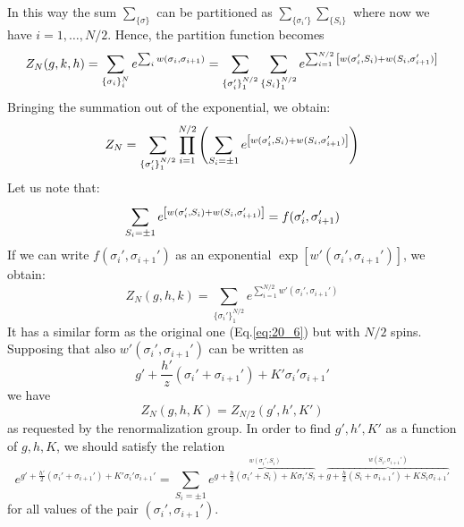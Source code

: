 \documentclass[../../Main/Main.tex]{subfiles}
\begin{document}
In this way the sum \( \sum_{\{ \sigma  \}  }^{}   \) can be partitioned as \( \sum_{\{ \sigma _i' \}  }^{} \sum_{\{ S_i \}  }^{}     \) where now we have \( i=1,\dots,N/2 \). Hence, the partition function becomes
\begin{equation}
  Z_N(g,k,h) = \sum_{\{ \sigma _i \}_i^N  }^{}  e^{\sum_{i}^{}  w (\sigma _i, \sigma _{i+1})}
  = \sum_{\{ \sigma _i' \}_1^{N/2}  }^{} \sum_{\{ S_i \}_1^{N/2}  }^{}
  e^{\sum_{i=1}^{N/2} \qty[w(\sigma _i',S_i) + w(S_i, \sigma _{i+1}')]  }
  \label{eq:20_6}
\end{equation}
Bringing the summation out of the exponential, we obtain:
\begin{equation*}
  Z_N = \sum_{\{ \sigma _i' \}_1^{N/2}} \prod_{i=1}^{N/2}  \qty(  \sum_{  S_i=\pm 1  }^{}  e^{ \qty[ w(\sigma _i',S_i) + w(S_i, \sigma _{i+1}') ]  }  )
\end{equation*}
Let us note that:
\begin{equation*}
   \sum_{  S_i=\pm 1  }^{}  e^{ \qty[ w(\sigma _i',S_i) + w(S_i, \sigma _{i+1}') ]  }
   = f (\sigma _i', \sigma _{i+1}')
\end{equation*}
If we can write \(  f (\sigma _i', \sigma _{i+1}') \) as an exponential
\( \exp [ w' (\sigma _i', \sigma _{i+1}')]  \), we obtain:
\begin{equation}
  Z_N (g,h,k) = \sum_{\{ \sigma _i' \}_1^{N/2}}  e^{\sum_{i=1}^{N/2}  w' (\sigma _i', \sigma _{i+1}') }
\end{equation}
It has a similar form as the original one (Eq.\eqref{eq:20_6}) but with \( N/2 \) spins.
Supposing that also \( w' (\sigma _i', \sigma _{i+1}')  \) can be written as
\begin{equation*}
  g' + \frac{h'}{z} (\sigma _i' + \sigma _{i+1}') + K' \sigma _i' \sigma _{i+1}'
\end{equation*}
we have
\begin{equation}
  Z_N (g,h,K) = Z_{N/2} (g',h',K')
\end{equation}
as requested by the renormalization group.
In order to find \( g',h',K' \) as a function of \( g,h,K \), we should satisfy the relation
\begin{equation}
  e^{ g' + \frac{h'}{2} (\sigma _i' + \sigma _{i+1}') + K' \sigma _i' \sigma _{i+1}' }
  = \sum_{S_i = \pm 1}^{}  e^{ \overbrace{g + \frac{h}{2}(\sigma _i' + S_i) + K \sigma _i' S_i}^{w(\sigma _i',S_i)}  + \overbrace{g + \frac{h}{2} (S_i + \sigma _{i+1}') + K S_i \sigma _{i+1}' }^{w(S_i,\sigma _{i+1}')}  }
\end{equation}
for all values of the pair \( (\sigma _i',\sigma _{i+1}') \).
\end{document}
